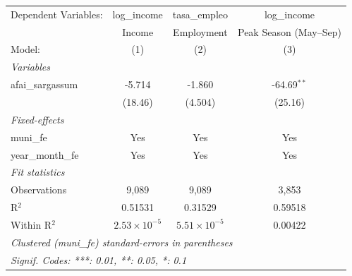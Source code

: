 \begingroup
\centering
\begin{tabular}{lccc}
   \tabularnewline \midrule \midrule
   Dependent Variables: & log\_income           & tasa\_empleo          & log\_income\\   
                        & Income                & Employment            & Peak Season (May--Sep) \\   
   Model:               & (1)                   & (2)                   & (3)\\  
   \midrule
   \emph{Variables}\\
   afai\_sargassum      & -5.714                & -1.860                & -64.69$^{**}$\\   
                        & (18.46)               & (4.504)               & (25.16)\\   
   \midrule
   \emph{Fixed-effects}\\
   muni\_fe             & Yes                   & Yes                   & Yes\\  
   year\_month\_fe      & Yes                   & Yes                   & Yes\\  
   \midrule
   \emph{Fit statistics}\\
   Observations         & 9,089                 & 9,089                 & 3,853\\  
   R$^2$                & 0.51531               & 0.31529               & 0.59518\\  
   Within R$^2$         & $2.53\times 10^{-5}$  & $5.51\times 10^{-5}$  & 0.00422\\  
   \midrule \midrule
   \multicolumn{4}{l}{\emph{Clustered (muni\_fe) standard-errors in parentheses}}\\
   \multicolumn{4}{l}{\emph{Signif. Codes: ***: 0.01, **: 0.05, *: 0.1}}\\
\end{tabular}
\par\endgroup

